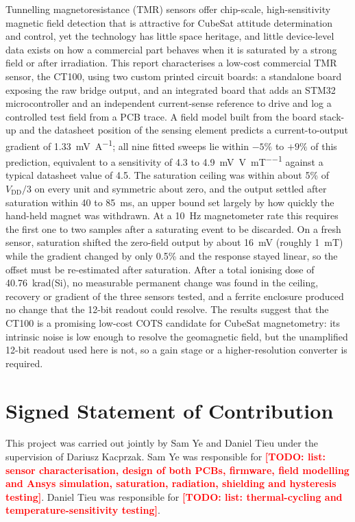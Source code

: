 \documentclass[12pt,a4paper]{article}
\newcommand{\todo}[1]{\textcolor{red}{\textbf{[TODO: #1]}}}
\begin{document}
Tunnelling magnetoresistance (TMR) sensors offer chip-scale, high-sensitivity magnetic field detection that is attractive for CubeSat attitude determination and control, yet the technology has little space heritage, and little device-level data exists on how a commercial part behaves when it is saturated by a strong field or after irradiation. This report characterises a low-cost commercial TMR sensor, the CT100, using two custom printed circuit boards: a standalone board exposing the raw bridge output, and an integrated board that adds an STM32 microcontroller and an independent current-sense reference to drive and log a controlled test field from a PCB trace. A field model built from the board stack-up and the datasheet position of the sensing element predicts a current-to-output gradient of \SI{1.33}{\milli\volt\per\ampere}; all nine fitted sweeps lie within $-5\%$ to $+9\%$ of this prediction, equivalent to a sensitivity of 4.3 to \SI{4.9}{\milli\volt\per\volt\per\milli\tesla} against a typical datasheet value of 4.5. The saturation ceiling was within about 5\% of $V_{\text{DD}}/3$ on every unit and symmetric about zero, and the output settled after saturation within 40 to \SI{85}{\milli\second}, an upper bound set largely by how quickly the hand-held magnet was withdrawn. At a \SI{10}{\hertz} magnetometer rate this requires the first one to two samples after a saturating event to be discarded. On a fresh sensor, saturation shifted the zero-field output by about \SI{16}{\milli\volt} (roughly \SI{1}{\milli\tesla}) while the gradient changed by only 0.5\% and the response stayed linear, so the offset must be re-estimated after saturation. After a total ionising dose of \SI{40.76}{\kilo rad}(Si), no measurable permanent change was found in the ceiling, recovery or gradient of the three sensors tested, and a ferrite enclosure produced no change that the 12-bit readout could resolve. The results suggest that the CT100 is a promising low-cost COTS candidate for CubeSat magnetometry: its intrinsic noise is low enough to resolve the geomagnetic field, but the unamplified 12-bit readout used here is not, so a gain stage or a higher-resolution converter is required.

\clearpage

\section*{Signed Statement of Contribution}
This project was carried out jointly by Sam Ye and Daniel Tieu under the supervision of Dariusz Kacprzak. Sam Ye was responsible for \todo{list: sensor characterisation, design of both PCBs, firmware, field modelling and Ansys simulation, saturation, radiation, shielding and hysteresis testing}. Daniel Tieu was responsible for \todo{list: thermal-cycling and temperature-sensitivity testing}.
 
\end{document}
